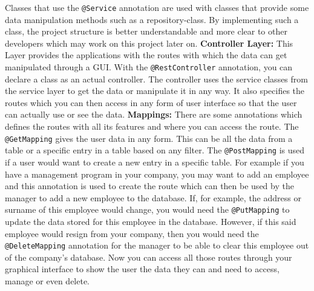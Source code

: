     Classes that use the \texttt{@Service} annotation are used with classes that provide some data manipulation methods such as a repository-class. By implementing such a class, the project structure is better understandable and more clear to other developers which may work on this project later on.  \newline
    \textbf{Controller Layer:} \newline
    This Layer provides the applications with the routes with which the data can get manipulated through a GUI. With the \texttt{@RestController} annotation, you can declare a class as an actual controller. The controller uses the service classes from the service layer to get the data or manipulate it in any way. It also specifies the routes which you can then
    access in any form of user interface so that the user can actually use or see the data. \newline
    \textbf{Mappings:} \newline
    There are some annotations which defines the routes with all its features and where you can access the route. The \texttt{@GetMapping} gives the user data in any form. This can be all the data from a table or a specific entry in a table based on any filter. The \texttt{@PostMapping} is used if a user would want to create a new entry in a specific table. 
    For example if you have a management program in your company, you may want to add an employee and this annotation is used to create the route which can then be used by the manager to add a new employee to the database. If, for example, the address or surname of this employee would change, you would need the \texttt{@PutMapping} to update
    the data stored for this employee in the database. However, if this said employee would resign from your company, then you would need the \texttt{@DeleteMapping} annotation for the manager to be able to clear this employee out of the company's database.
    Now you can access all those routes through your graphical interface to show the user the data they can and need to access, manage or even delete.
    
